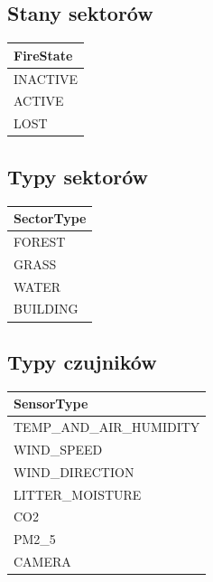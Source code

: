 \documentclass[11pt,a4paper] {article}
\begin{document}
\subsection{Stany sektorów}

\begin{longtable}{|l|}
\hline
\textbf{FireState} \\
\hline
INACTIVE \\
\hline
ACTIVE \\
\hline
LOST \\
\hline
\end{longtable}

\subsection{Typy sektorów}

\begin{longtable}{|l|}
\hline
\textbf{SectorType} \\
\hline
FOREST \\
\hline
GRASS \\
\hline
WATER \\
\hline
BUILDING \\
\hline
\end{longtable}

\subsection{Typy czujników}

\begin{longtable}{|l|}
\hline
\textbf{SensorType} \\
\hline
TEMP\_AND\_AIR\_HUMIDITY \\
\hline
WIND\_SPEED \\
\hline
WIND\_DIRECTION \\
\hline
LITTER\_MOISTURE \\
\hline
CO2 \\
\hline
PM2\_5 \\
\hline
CAMERA \\
\hline
\end{longtable}
\end{document}
